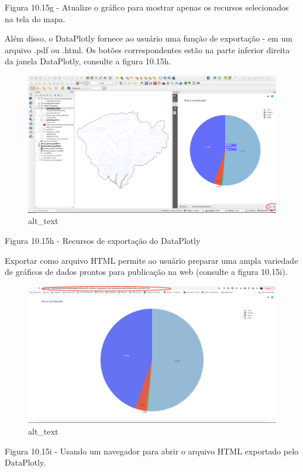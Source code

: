 \documentclass[
  portuguese,
]{krantz}
\begin{document}
Figura 10.15g - Atualize o gráfico para mostrar apenas os recursos selecionados na tela do mapa.

Além disso, o DataPlotly fornece ao usuário uma função de exportação - em um arquivo .pdf ou .html. Os botões correspondentes estão na parte inferior direita da janela DataPlotly, consulte a figura 10.15h.

\begin{figure}
\centering
\includegraphics{media/modulo10/fig1015_h.png}
\caption{alt\_text}
\end{figure}

Figura 10.15h - Recursos de exportação do DataPlotly

Exportar como arquivo HTML permite ao usuário preparar uma ampla variedade de gráficos de dados prontos para publicação na web (consulte a figura 10.15i).

\begin{figure}
\centering
\includegraphics{media/modulo10/fig1015_i.png}
\caption{alt\_text}
\end{figure}

Figura 10.15i - Usando um navegador para abrir o arquivo HTML exportado pelo DataPlotly.
\end{document}
